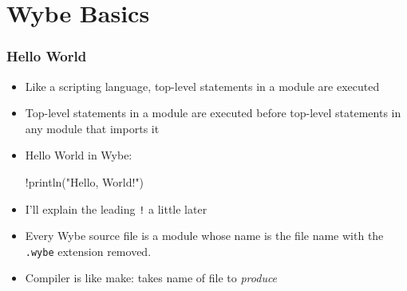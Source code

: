 \documentclass[12pt]{beamer}
\begin{document}
\section{Wybe Basics}

\begin{frame}[fragile]
\frametitle{Hello World}
\vspace*{-2ex}
\begin{itemize}
\item Like a scripting language, top-level statements in a module are executed
\item Top-level statements in a module are executed before top-level statements
  in any module that imports it
\item Hello World in Wybe:\vspace*{-1ex}
  \begin{minipage}{0.95\linewidth}
    \begin{block}{}
\begin{semiverbatim}
!println("Hello, World!")
\end{semiverbatim}
    \end{block}
  \end{minipage}
\item I'll explain the leading \texttt{!} a little later
\item Every Wybe source file is a module whose name is the file name with the
  \texttt{.wybe} extension removed.
\item Compiler is like make:  takes name of file to \emph{produce}\vspace*{-1ex}
  \begin{minipage}{0.95\linewidth}
    \begin{block}{}
    \end{block}
  \end{minipage}
\end{itemize}
\end{frame}
\end{document}
